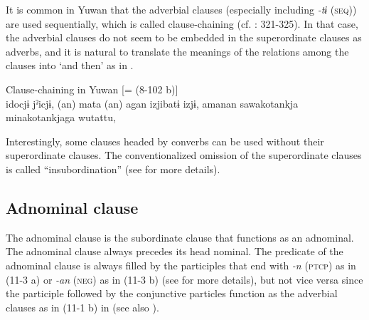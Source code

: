 It is common in Yuwan that the adverbial clauses (especially including \textit{{}-tɨ} (\textsc{seq})) are used sequentially, which is called clause-chaining (cf. \citealt{Payne1997}: 321-325). In that case, the adverbial clauses do not seem to be embedded in the superordinate clauses as adverbs, and it is natural to translate the meanings of the relations among the clauses into ‘and then’ as in .

\ea\label{ex:11-2}  Clause-chaining in Yuwan [= (8-102 b)]\\
    \glll idocjɨ  jˀicjɨ,  (an)  mata  (an)  agan izjibatɨ  izjɨ,  amanan  sawakotankja minakotankjaga  wutattu,\\
    [\textit{ido=ccjɨ}  {\textit{jˀ-\Highlight{tɨ}}]\textsubscript{Adverbial clause}}  \textit{a-n}  \textit{mata}  \textit{a-n}  [\textit{aga-n} \textit{izir-i+bar-tɨ}  {\textit{ik-\Highlight{tɨ}}]\textsubscript{Adverbial clause}} [\textit{a-ma=nan}  \textit{sawako-taa=nkja}  \textit{minako-taa=nkja=ga}  {\textit{wur-tar-tu}]\textsubscript{Adverbial clause}}\\
    oh=\textsc{qt}  say-\textsc{seq}  \textsc{dist}-\textsc{adn}Z  again  DI\textsc{st}-\textsc{adnz}  DIST-\textsc{advz} go.out-\textsc{inf}+?-SEQ  go-SEQ  DIST-place=\textsc{loc}1  Sawako-\textsc{pl}=\textsc{appr} Minako-PL=\textsc{app}R=\textsc{nom}  exist-\textsc{pst}-\textsc{csl}\\
    \glt ‘Saying that “Oh!” (I) went out there again, and there were Sawako, Minako and their friends, so ...’ [Co: 101020\_01.txt]
\z

Interestingly, some clauses headed by converbs can be used without their superordinate clauses. The conventionalized omission of the superordinate clauses is called “insubordination” (see  for more details).

\subsection{Adnominal clause}\label{sec:11.1.2}

The adnominal clause is the subordinate clause that functions as an adnominal. The adnominal clause always precedes its head nominal. The predicate of the adnominal clause is always filled by the participles that end with \textit{{}-n} (\textsc{ptcp}) as in (11-3 a) or \textit{{}-an} (\textsc{neg}) as in (11-3 b) (see  for more details), but not vice versa since the participle followed by the conjunctive particles function as the adverbial clauses as in (11-1 b) in  (see also ).

